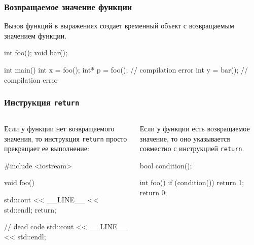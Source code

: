 \documentclass[compress, 8pt]{beamer}
\begin{document}
\begin{frame}[fragile]

    \frametitle{Возвращаемое значение функции}

    Вызов функций в выражениях создает временный объект с возвращаемым
    значением функции.

    \begin{myinplacelisting}[minted language=cpp]
int foo();
void bar();

int main() {
    int x = foo();
    int* p = foo(); // compilation error
    int y = bar(); // compilation error
}
    \end{myinplacelisting}

\end{frame}

\begin{frame}[fragile]

    \frametitle{Инструкция \texttt{return}}

    \begin{columns}[T]

        \begin{column}{0.5\textwidth}

            Если у функции нет возвращаемого значения, то инструкция \verb|return|
            просто прекращает ее выполнение:

            \begin{myinplacelisting}[minted language=cpp]
#include <iostream>

void foo() {
    std::cout << __LINE__
        << std::endl;
    return;

    // dead code
    std::cout << __LINE__
        << std::endl;
}
            \end{myinplacelisting}

        \end{column}

        \begin{column}{0.5\textwidth}

            Если у функции есть возвращаемое значение, то оно указывается
            совместно с инструкцией \verb|return|.

            \begin{myinplacelisting}[minted language=cpp]
bool condition();

int foo() {
    if (condition()) {
        return 1;
    }
    return 0;
}
            \end{myinplacelisting}

        \end{column}

    \end{columns}

\end{frame}
\end{document}
